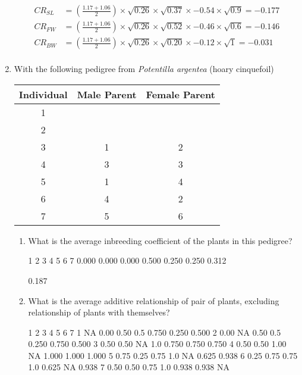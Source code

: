 \documentclass[12pt,a4paper]{paper}
\begin{document}
\begin{enumerate}
\begin{equation*}
\begin{split}
CR_{SL} &= \left(\frac{1.17 + 1.06}{2}\right) \times \sqrt{0.26} \times \sqrt{0.37} \times -0.54 \times \sqrt{0.9} = -0.177\\
CR_{FW} &= \left(\frac{1.17 + 1.06}{2}\right) \times \sqrt{0.26} \times \sqrt{0.52} \times -0.46 \times \sqrt{0.6} = -0.146\\
CR_{BW} &= \left(\frac{1.17 + 1.06}{2}\right) \times \sqrt{0.26} \times \sqrt{0.20} \times -0.12 \times \sqrt{1} = -0.031\\
\end{split}
\end{equation*}
\item With the following pedigree from \textit{Potentilla argentea} (hoary cinquefoil)
\begin{center}
\begin{tabular}{|c|c|c|}
\hline
Individual&Male Parent&Female Parent\\
\hline
1&&\\
\hline
2&&\\
\hline
3&1&2\\
\hline
4&3&3\\
\hline
5&1&4\\
\hline
6&4&2\\
\hline
7&5&6\\
\hline
\end{tabular}
\end{center}
\begin{enumerate}
\item What is the average inbreeding coefficient of the plants in this pedigree?
\begin{Schunk}
\begin{Soutput}
    1     2     3     4     5     6     7 
0.000 0.000 0.000 0.500 0.250 0.250 0.312 
\end{Soutput}
\begin{Soutput}
[1] 0.187
\end{Soutput}
\end{Schunk}
\item What is the average additive relationship of pair of plants, excluding relationship of plants with themselves?
\begin{Schunk}
\begin{Soutput}
     1    2    3   4     5     6     7
1   NA 0.00 0.50 0.5 0.750 0.250 0.500
2 0.00   NA 0.50 0.5 0.250 0.750 0.500
3 0.50 0.50   NA 1.0 0.750 0.750 0.750
4 0.50 0.50 1.00  NA 1.000 1.000 1.000
5 0.75 0.25 0.75 1.0    NA 0.625 0.938
6 0.25 0.75 0.75 1.0 0.625    NA 0.938
7 0.50 0.50 0.75 1.0 0.938 0.938    NA

\end{Soutput}
\end{Schunk}
\end{enumerate}
\end{enumerate}
\end{document}
